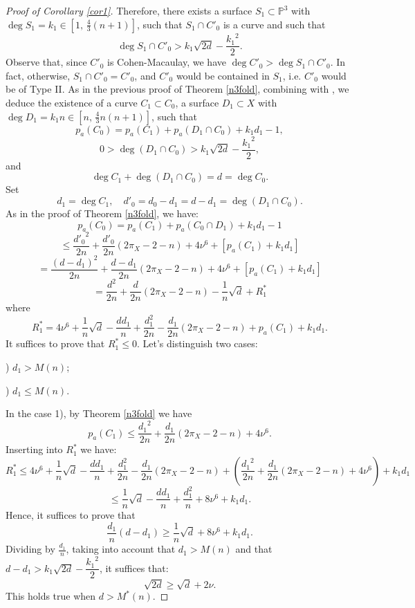 \documentclass[9pt,a4paper]{amsart}
\theoremstyle{plain}
\theoremstyle{definition}
\theoremstyle{remark}
\begin{document}
\begin{proof}[Proof of Corollary \ref{cor1}]
Therefore, there exists a surface  $S_1\subset \mathbb P^3$ with
$\deg S_1=k_1\in [1,\,\frac{4}{3}(n+1)]$,  such that $S_1\cap C'_0$
is a curve and such that
$$
\deg S_1\cap C'_0>  k_1\sqrt{2d}-\dfrac{{k_1}^2}{2}.
$$
Observe that, since $C'_0$ is Cohen-Macaulay,  we have $\deg
C'_0>\deg S_1\cap C'_0$. In fact, otherwise,  $S_1\cap C'_0=C'_0$,
and $C'_0$ would be contained in $S_1$, i.e. $C'_0$ would be of Type
II. As in the previous proof of Theorem \ref{n3fold},
combining \cite[Lemma 3.1]{Liu} with \cite[Proposition
3.15]{Liu}, we deduce the existence of a  curve $C_1\subset C_0$, a
surface $D_1\subset X$  with $\deg D_1=k_1n\in
[n,\,\frac{4}{3}n(n+1)]$, such that
\begin{equation*}
p_a(C_0)=p_a(C_1)+p_a(D_1\cap C_0)+k_1d_1-1,
\end{equation*}
$$
0>\deg (D_1\cap C_0) >  k_1\sqrt{2d}-\dfrac{{k_1}^2}{2},
$$
and
$$
\deg C_1+\deg(D_1\cap C_0)=d=\deg C_0.
$$
Set
$$
d_1=\deg C_1,\quad d'_0=d_0-d_1=d-d_1=\deg (D_1\cap C_0).
$$
As in the proof of Theorem \ref{n3fold}, we have:
$$
p_a(C_0)=p_a(C_1)+p_a(C_0\cap D_1)+k_1d_1-1
$$
$$
\leq
\frac{{d'_0}^2}{2n}+\frac{d'_0}{2n}(2\pi_X-2-n)+4\nu^6+[p_a(C_1)+k_1d_1]
$$
$$
=\frac{({d-d_1})^2}{2n}+\frac{d-d_1}{2n}(2\pi_X-2-n)+4\nu^6+[p_a(C_1)+k_1d_1]
$$
$$
=\frac{{d}^2}{2n}+\frac{d}{2n}\left(2\pi_X-2-n\right)-\frac{1}{n}\sqrt{d}+R^*_1
$$
where
$$
R^*_1=4\nu^6+\frac{1}{n}\sqrt{d}-\frac{dd_1}{n}+\frac{d_1^2}{2n}-\frac{d_1}{2n}(2\pi_X-2-n)+p_a(C_1)+k_1d_1.
$$
It suffices to prove that $R^*_1\leq 0$. Let's distinguish two
cases:

) $d_1>M(n)$;

) $d_1\leq M(n)$.

\smallskip
In the case 1), by Theorem \ref{n3fold} we have
$$
p_a(C_1)\leq \frac{{d_1}^2}{2n}+\frac{d_1}{2n}(2\pi_X-2-n)+4\nu^6.
$$
Inserting into $R^*_1$ we have:
$$
R^*_1\leq
4\nu^6+\frac{1}{n}\sqrt{d}-\frac{dd_1}{n}+\frac{d_1^2}{2n}-\frac{d_1}{2n}(2\pi_X-2-n)+\left(\frac{{d_1}^2}{2n}+\frac{d_1}{2n}(2\pi_X-2-n)+4\nu^6\right)+k_1d_1
$$
$$
\leq
\frac{1}{n}\sqrt{d}-\frac{dd_1}{n}+\frac{d_1^2}{n}+8\nu^6+k_1d_1.
$$
Hence, it suffices to prove that
$$
\frac{d_1}{n}(d-d_1)\geq  \frac{1}{n}\sqrt{d}+8\nu^6+k_1d_1.
$$
Dividing by $\frac{d_1}{n}$, taking into account that $d_1>M(n)$ and
that $d-d_1>k_1\sqrt{2d}-\dfrac{{k_1}^2}{2}$, it suffices that:
$$
\sqrt{2d}\geq \sqrt{d}+2\nu.
$$
This holds true when $d>M^*(n)$.


\end{proof}
\end{document}
